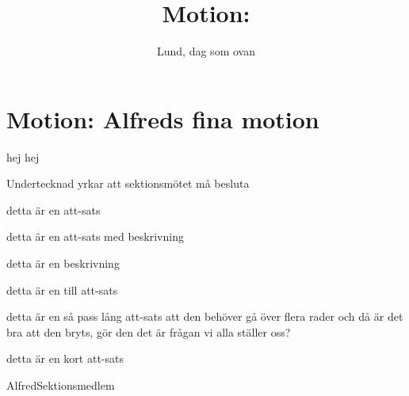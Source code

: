 \documentclass[nopdfbookmarks,a4paper, 11pt, twoside]{article}
\title{Motion: \TITLE}
\newcommand{\TITLE}{Alfreds fina motion} %
\newcommand{\TEXT}{hej hej \dsek} %
\newcommand{\UNDER}{Undertecknad yrkar att sektionsmötet må besluta}
\newcommand{\ATT}[1]{\item #1}
\newcommand{\ATTDESC}[2]{\item #1 \begin{description} \item #2 \end{description}}
\begin{document}
\section*{Motion: \TITLE}


\TEXT

\UNDER


\begin{attlista}
	\ATT{detta är en att-sats} %
	\ATTDESC{detta är en att-sats med beskrivning}{detta är en beskrivning}
    \ATT{detta är en till att-sats}
    \ATT{detta är en så pass lång att-sats att den behöver gå över flera rader och då är det bra att den bryts, gör den det är frågan vi alla ställer oss?}
    \ATT{detta är en kort att-sats}
\end{attlista}

\signature{Lund, dag som ovan}{Alfred}{Sektionsmedlem}
\end{document}
